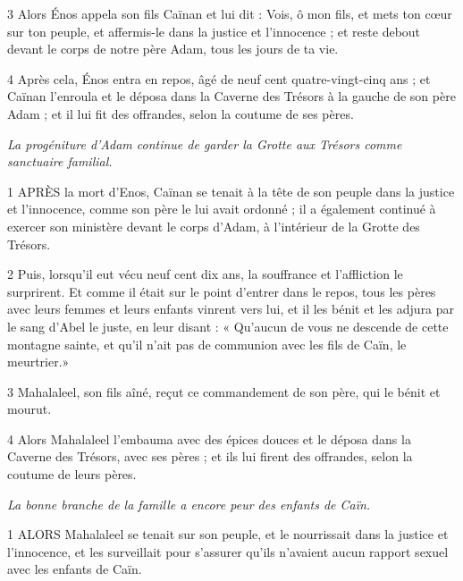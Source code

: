 \par 3 Alors Énos appela son fils Caïnan et lui dit : Vois, ô mon fils, et mets ton cœur sur ton peuple, et affermis-le dans la justice et l'innocence ; et reste debout devant le corps de notre père Adam, tous les jours de ta vie.

\par 4 Après cela, Énos entra en repos, âgé de neuf cent quatre-vingt-cinq ans ; et Caïnan l'enroula et le déposa dans la Caverne des Trésors à la gauche de son père Adam ; et il lui fit des offrandes, selon la coutume de ses pères.


\par \textit{La progéniture d'Adam continue de garder la Grotte aux Trésors comme sanctuaire familial.}

\par 1 APRÈS la mort d'Enos, Caïnan se tenait à la tête de son peuple dans la justice et l'innocence, comme son père le lui avait ordonné ; il a également continué à exercer son ministère devant le corps d'Adam, à l'intérieur de la Grotte des Trésors.

\par 2 Puis, lorsqu'il eut vécu neuf cent dix ans, la souffrance et l'affliction le surprirent. Et comme il était sur le point d'entrer dans le repos, tous les pères avec leurs femmes et leurs enfants vinrent vers lui, et il les bénit et les adjura par le sang d'Abel le juste, en leur disant : « Qu'aucun de vous ne descende de cette montagne sainte, et qu'il n'ait pas de communion avec les fils de Caïn, le meurtrier.»

\par 3 Mahalaleel, son fils aîné, reçut ce commandement de son père, qui le bénit et mourut.

\par 4 Alors Mahalaleel l'embauma avec des épices douces et le déposa dans la Caverne des Trésors, avec ses pères ; et ils lui firent des offrandes, selon la coutume de leurs pères.




\par \textit{La bonne branche de la famille a encore peur des enfants de Caïn.}

\par 1 ALORS Mahalaleel se tenait sur son peuple, et le nourrissait dans la justice et l'innocence, et les surveillait pour s'assurer qu'ils n'avaient aucun rapport sexuel avec les enfants de Caïn.

